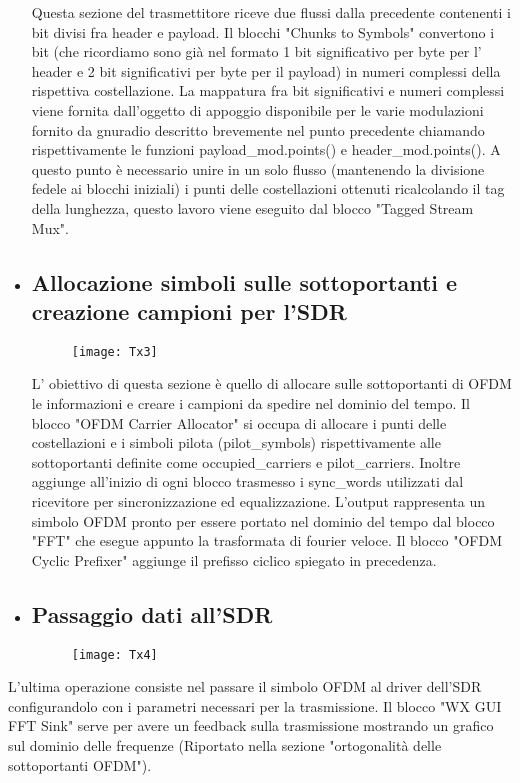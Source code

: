 \begin{itemize}
 Questa sezione del trasmettitore riceve due flussi dalla precedente contenenti i bit divisi fra header e payload. Il blocchi "Chunks to Symbols" convertono i bit (che ricordiamo sono già nel formato 1 bit significativo per byte per l' header e 2 bit significativi per byte per il payload) in numeri complessi della rispettiva costellazione. La mappatura fra bit significativi e numeri complessi viene fornita dall'oggetto di appoggio disponibile per le varie modulazioni fornito da gnuradio descritto brevemente nel punto precedente chiamando rispettivamente le funzioni payload\_mod.points() e header\_mod.points(). A questo punto è necessario unire in un solo flusso (mantenendo la divisione fedele ai blocchi iniziali) i punti delle costellazioni ottenuti ricalcolando il tag della lunghezza, questo lavoro viene eseguito dal blocco "Tagged Stream Mux".
 	\item \subsection{Allocazione simboli sulle sottoportanti e creazione campioni per l'SDR}
 	\begin{figure}[h]
 		\centering
 		\texttt{[image: Tx3]}
 		\caption{}
 	\end{figure}
 L' obiettivo di questa sezione è quello di allocare sulle sottoportanti di OFDM le informazioni e creare i campioni da spedire nel dominio del tempo. Il blocco "OFDM Carrier Allocator" si occupa di allocare i punti delle costellazioni e i simboli pilota (pilot\_symbols) rispettivamente alle sottoportanti definite come occupied\_carriers e pilot\_carriers. Inoltre aggiunge all'inizio di ogni blocco trasmesso i sync\_words utilizzati dal ricevitore per sincronizzazione ed equalizzazione. L'output rappresenta un simbolo OFDM pronto per essere portato nel dominio del tempo dal blocco  "FFT" che esegue appunto la trasformata di fourier veloce. Il blocco "OFDM Cyclic Prefixer" aggiunge il prefisso ciclico spiegato in precedenza.
 
 	\item \subsection{Passaggio dati all'SDR}
 	\begin{figure}[h]
 		\centering
 		\texttt{[image: Tx4]}
 		\caption{}
 	\end{figure}
 \end{itemize}
L'ultima operazione consiste nel passare il simbolo OFDM al driver dell'SDR configurandolo con i parametri necessari per la trasmissione. Il blocco "WX GUI FFT Sink" serve per avere un feedback sulla trasmissione mostrando un grafico sul dominio delle frequenze (Riportato nella sezione "ortogonalità delle sottoportanti OFDM").
